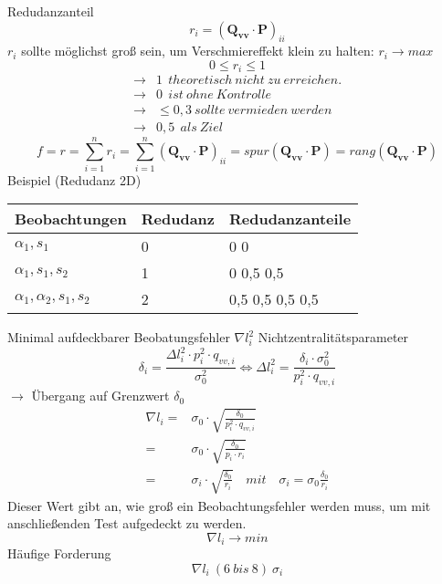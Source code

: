 \documentclass[12pt]{article}
\begin{document}
Redudanzanteil
\begin{equation*}
r_i = (\bm{Q_{vv}} \cdot \bm{P})_{ii}
\end{equation*}
$r_i$ sollte möglichst groß sein, um Verschmiereffekt klein zu halten: $r_i \rightarrow max$
\begin{equation*}
0 \leq r_i \leq 1 
\end{equation*}
\begin{align*}
\rightarrow & 1 \ \ theoretisch\  nicht\  zu\  erreichen.\\
\rightarrow &0\ \ ist\  ohne\  Kontrolle\\
\rightarrow &\leq 0,3 \ sollte\  vermieden\  werden \\
\rightarrow &0,5 \ \ als\ Ziel
\end{align*}
\begin{equation*}
f = r = \sum_{i = 1}^{n} r_i = \sum_{i = 1}^{n} (\bm{Q_{vv}} \cdot \bm{P})_{ii} = spur(\bm{Q_{vv}} \cdot \bm{P}) = rang(\bm{Q_{vv}} \cdot \bm{P})
\end{equation*}
Beispiel (Redudanz 2D)
\begin{figure*}[ht]\centering
\end{figure*}
\begin{table}[ht]\centering
	\begin{tabular}{|l|l|l|}
		\hline
	Beobachtungen & Redudanz     &   Redudanzanteile      \\ \hline
		$\alpha_1,s_1$      & 0  & 0   0   \\ \hline
		$\alpha_1, s_1, s_2$     & 1  & 0   0,5   0,5  \\ \hline
		$\alpha_1, \alpha_2, s_1, s_2$      & 2  & 0,5   0,5   0,5   0,5   \\ \hline
	\end{tabular}
\end{table}
\newline
Minimal aufdeckbarer Beobatungsfehler $\nabla l_i^2$ \newline
Nichtzentralitätsparameter
\begin{equation*}
\delta_i = \frac{\Delta l_i^2 \cdot p_i^2 \cdot q_{vv,i}}{\sigma_0^2} \Leftrightarrow \Delta l_i^2 = \frac{\delta_i \cdot \sigma_0^2}{p_i^2 \cdot q_{vv,i}}
\end{equation*}
$\longrightarrow$ Übergang auf Grenzwert $\delta_0$
\begin{align*}
\nabla l_i = & \sigma_0 \cdot \sqrt{\frac{\delta_0}{p_i^2 \cdot q_{vv,i}}} \\
=& \sigma_0 \cdot \sqrt{\frac{\delta_0}{p_i \cdot r_i}} \\
=& \sigma_i \cdot \sqrt{\frac{\delta_0}{r_i}} \quad mit \quad  \sigma_i = \sigma_0 \frac{\delta_0}{r_i}
\end{align*}
Dieser Wert gibt an, wie groß ein Beobachtungsfehler werden muss, um mit anschließenden Test aufgedeckt zu werden.
\begin{equation*}
\nabla l_i \longrightarrow min
\end{equation*}
Häufige Forderung
\begin{equation*}
\nabla l_i ~ (6\ bis \ 8)\ \sigma_i
\end{equation*}
\end{document}
